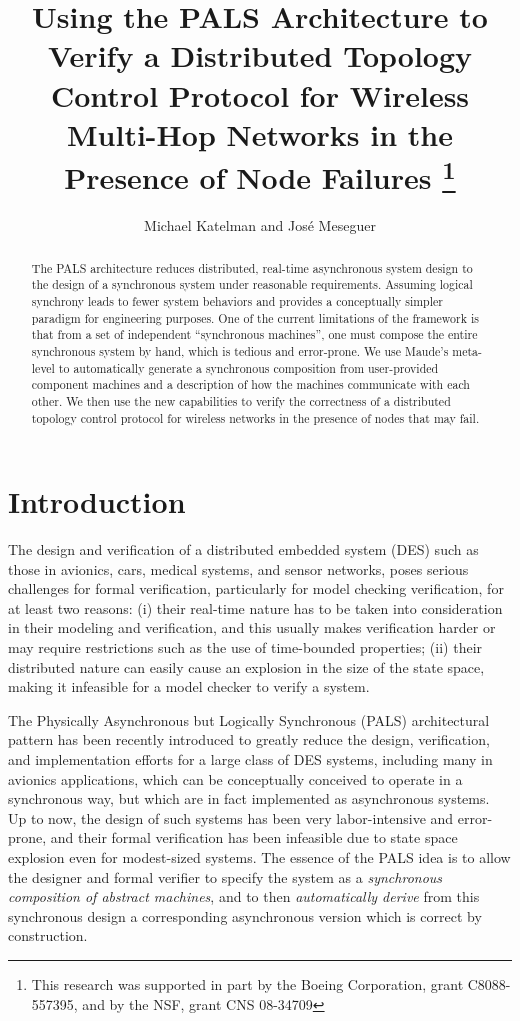 \documentclass[copyright,creativecommons]{eptcs}
\title{Using the PALS Architecture to Verify a Distributed Topology Control
Protocol for Wireless Multi-Hop Networks in the Presence of Node Failures
\thanks{This research was supported in part by the Boeing Corporation, grant C8088-557395, and by the NSF, grant CNS 08-34709}
}
\author{
  Michael Katelman and Jos\'{e} Meseguer
  \institute{Department of Computer Science \\
             University of Illinois at Urbana-Champaign \\
             Urbana, IL 61801, USA}
  \email{\{katelman,meseguer\}@uiuc.edu}
}
\begin{document}
\maketitle

\begin{abstract}
The PALS architecture reduces distributed, real-time asynchronous system design
to the design of a synchronous system under reasonable requirements. Assuming
logical synchrony leads to fewer system behaviors and provides a conceptually
simpler paradigm for engineering purposes. One of the current limitations of
the framework is that from a set of independent ``synchronous machines'', one
must compose the entire synchronous system by hand, which is tedious and
error-prone. We use Maude's meta-level to automatically generate a synchronous
composition from user-provided component machines and a description of how the
machines communicate with each other. We then use the new capabilities to
verify the correctness of a distributed topology control protocol for wireless
networks in the presence of nodes that may fail.
\end{abstract}

\section{Introduction}

The design and verification of a distributed embedded system (DES) such as
those in avionics, cars, medical systems, and sensor networks, poses serious
challenges for formal verification, particularly for model checking
verification,  for at least two reasons: (i) their real-time nature has to be
taken into consideration in their modeling and verification, and this usually
makes verification harder or may require restrictions such as the use of
time-bounded properties; (ii) their distributed nature can easily cause an
explosion in the size of the state space, making it infeasible for a model
checker to verify a system.

The Physically Asynchronous but Logically Synchronous (PALS) architectural
pattern \cite{meseguer_2010_01,meseguer_2009_01,sha_2009_01,miller_2009_01} has been recently
introduced to greatly reduce the design, verification, and implementation
efforts for a large class of DES systems, including many in avionics
applications, which can be conceptually conceived to operate in a synchronous
way, but which are in fact implemented as asynchronous systems.  Up to now, the
design of such systems has been very labor-intensive and error-prone, and their
formal verification has been infeasible due to state space explosion even for
modest-sized systems.  The essence of the PALS idea is to allow the designer
and formal verifier to specify the system as a \emph{synchronous composition of
abstract machines}, and to then \emph{automatically derive} from this
synchronous design a corresponding asynchronous version which is correct by
construction.
\end{document}
